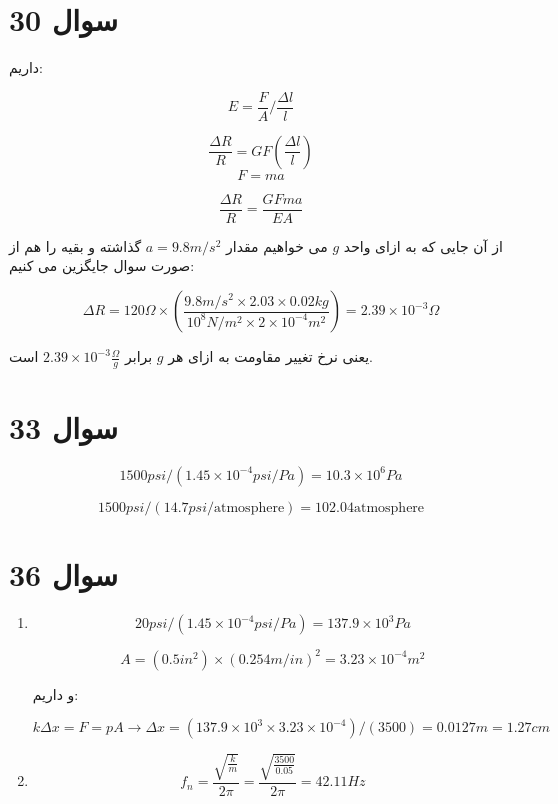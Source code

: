 \documentclass[12pt]{article}
\begin{document}
\section*{سوال 30}

داریم:

$$E = \frac{F}{A} / \frac{\Delta l}{l}$$

$$\frac{\Delta R} { R} = GF (\frac{\Delta l}{l})$$
$$F=ma$$

$$\frac{\Delta R}{R} = \frac{GF m a}{E A}$$

از آن جایی که به ازای واحد $g$ می خواهیم مقدار $a=9.8m/s^2$ گذاشته و بقیه را هم از صورت سوال جایگزین می کنیم:

$$\Delta R = 120 \Omega \times (\frac{9.8 m/s^2 \times 2.03 \times0.02 kg }{10^8 N/m^2 \times 2 \times 10^{-4} m^2}) = 2.39 \times 10^{-3} \Omega$$

یعنی نرخ تغییر مقاومت به ازای هر $g$ برابر 
$2.39 \times 10^{-3} \frac{\Omega}{g}$
است.


\section*{سوال 33}

$$1500 psi / (1.45 \times 10^{-4} psi/Pa) = 10.3 \times 10^6 Pa$$

$$1500 psi / (14.7 psi /\text{atmosphere}) =  102.04 \text{atmosphere}$$


\section*{سوال 36}

\begin{enumerate}
	\item 
	$$20psi / (1.45 \times 10^{-4} psi/Pa)= 137.9 \times 10^3 Pa$$
	
	$$A = (0.5 in^2) \times (0.254 m/in)^2 = 3.23 \times 10^{-4} m^2$$
	
	و داریم:
	
	$$k \Delta x = F = p A \rightarrow \Delta x = (137.9 \times 10^3 \times 3.23 \times 10^{-4})/(3500) = 0.0127 m = 1.27 cm$$
	
	\item
$$f_n = \frac{\sqrt{\frac{k}{m}}}{2 \pi } = \frac{\sqrt{\frac{3500}{0.05}}}{2 \pi } = 42.11 Hz$$
\end{enumerate}
\end{document}

